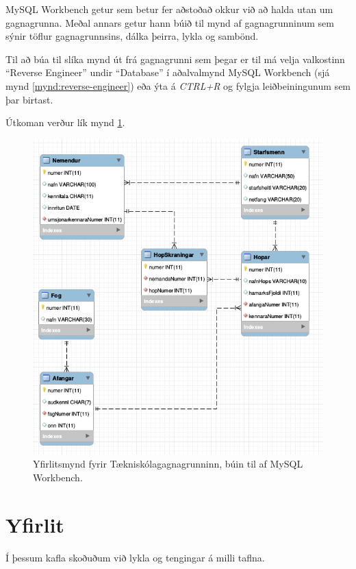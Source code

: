 MySQL Workbench getur sem betur fer aðstoðað okkur við að halda utan um gagnagrunna. Meðal annars getur hann búið til mynd af gagnagrunninum sem sýnir töflur gagnagrunnsins, dálka þeirra, lykla og sambönd.

Til að búa til slíka mynd út frá gagnagrunni sem þegar er til má velja valkostinn ``Reverse Engineer'' undir ``Database'' í aðalvalmynd MySQL Workbench (sjá mynd \ref{mynd:reverse-engineer}) eða ýta á \emph{CTRL+R} og fylgja leiðbeiningunum sem þar birtast. 

Útkoman verður lík mynd \ref{mynd:eer}.
\begin{figure}
\caption[Tækniskólagagnagrunnurinn]{Yfirlitsmynd fyrir Tækniskólagagnagrunninn, búin til af MySQL Workbench.}
\label{mynd:eer}
\centering
\includegraphics[width=\linewidth]{myndir/workbench-eer}
\end{figure}

\section{Yfirlit}
Í þessum kafla skoðuðum við lykla og tengingar á milli taflna.

